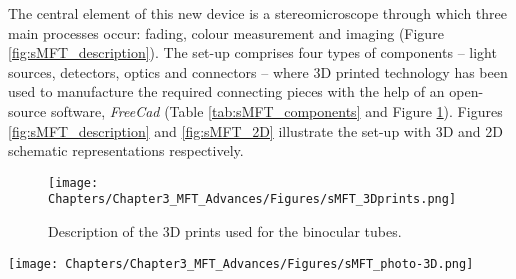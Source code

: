 The central element of this new device is a stereomicroscope \citep{zeiss_sv6_2000} through which three main processes occur: fading, colour measurement and imaging (Figure \ref{fig:sMFT_description}). The set-up comprises four types of components – light sources, detectors, optics and connectors – where 3D printed technology has been used to manufacture the required connecting pieces with the help of an open-source software, \textit{FreeCad} \citep{riegel_freecad_2021} (Table \ref{tab:sMFT_components} and Figure \ref{fig:sMFT_3Dprints}). Figures \ref{fig:sMFT_description} and \ref{fig:sMFT_2D} illustrate the set-up with 3D and 2D schematic representations respectively. \\

\vspace{1.2cm}

\begin{figure}[!h]
\centering
\texttt{[image: Chapters/Chapter3\_MFT\_Advances/Figures/sMFT\_3Dprints.png]}
\caption[\hspace{0.3cm}Description of the 3D prints used for the binocular tubes]{Description of the 3D prints used for the binocular tubes.}
\label{fig:sMFT_3Dprints}
\end{figure}

\begin{figure*}[!h]
\centering
\texttt{[image: Chapters/Chapter3\_MFT\_Advances/Figures/sMFT\_photo-3D.png]}
\caption[\hspace{0.3cm}Description of the stereo-MFT in the co-axial mode]{Description of the stereo-MFT in the co-axial mode: (a) photograph and (b) 3D representation.}
\label{fig:sMFT_description}
\end{figure*}



